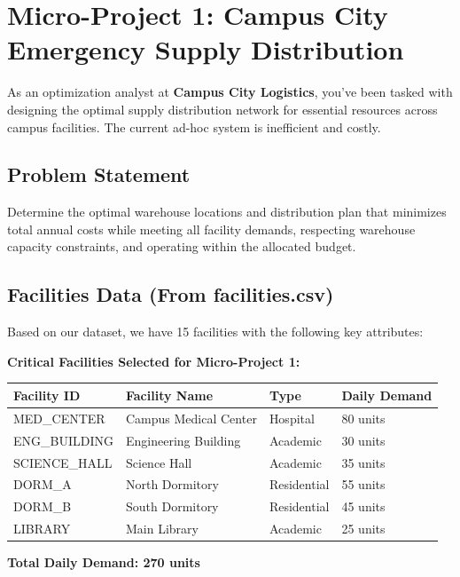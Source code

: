 \documentclass[
  letterpaper,
  DIV=11,
  numbers=noendperiod]{scrreprt}
\begin{document}
\section{Micro-Project 1: Campus City Emergency Supply
Distribution}\label{micro-project-1-campus-city-emergency-supply-distribution}

As an optimization analyst at \textbf{Campus City Logistics}, you've
been tasked with designing the optimal supply distribution network for
essential resources across campus facilities. The current ad-hoc system
is inefficient and costly.

\subsection{Problem Statement}\label{problem-statement-1}

Determine the optimal warehouse locations and distribution plan that
minimizes total annual costs while meeting all facility demands,
respecting warehouse capacity constraints, and operating within the
allocated budget.

\subsection{Facilities Data (From
facilities.csv)}\label{facilities-data-from-facilities.csv}

Based on our dataset, we have 15 facilities with the following key
attributes:

\textbf{Critical Facilities Selected for Micro-Project 1:}

\begin{longtable}[]{@{}llll@{}}
\toprule\noalign{}
Facility ID & Facility Name & Type & Daily Demand \\
\midrule\noalign{}
\endhead
\bottomrule\noalign{}
\endlastfoot
MED\_CENTER & Campus Medical Center & Hospital & 80 units \\
ENG\_BUILDING & Engineering Building & Academic & 30 units \\
SCIENCE\_HALL & Science Hall & Academic & 35 units \\
DORM\_A & North Dormitory & Residential & 55 units \\
DORM\_B & South Dormitory & Residential & 45 units \\
LIBRARY & Main Library & Academic & 25 units \\
\end{longtable}

\textbf{Total Daily Demand: 270 units}
\end{document}
